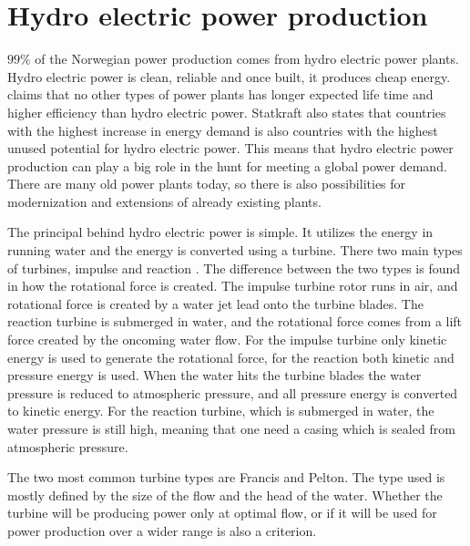 \section{Hydro electric power production}\label{ref:sec_hydropower}
    $99\%$ of the Norwegian power production comes from hydro electric power plants. Hydro electric power is clean, reliable and once built, it produces cheap energy. \cite{Statkraft2009} claims that no other types of power plants has longer expected life time and higher efficiency than hydro electric power. Statkraft also states that countries with the highest increase in energy demand is also countries with the highest unused potential for hydro electric power. This means that hydro electric power production can play a big role in the hunt for meeting a global power demand. There are many old power plants today, so there is also possibilities for modernization and extensions of already existing plants. 
    
    The principal behind hydro electric power is simple. It utilizes the energy in running water and the energy is converted using a turbine. There two main types of turbines, impulse and reaction \cite{Paish2002}. The difference between the two types is found in how the rotational force is created. The impulse turbine rotor runs in air, and rotational force is created by a water jet lead onto the turbine blades. The reaction turbine is submerged in water, and the rotational force comes from a lift force created by the oncoming water flow. For the impulse turbine only kinetic energy is used to generate the rotational force, for the reaction both kinetic and pressure energy is used. When the water hits the turbine blades the water pressure is reduced to atmospheric pressure, and all pressure energy is converted to kinetic energy. For the reaction turbine, which is submerged in water, the water pressure is still high, meaning that one need a casing which is sealed from atmospheric pressure. 
    
    
    
    The two most common turbine types are Francis and Pelton. The type used is mostly defined by the size of the flow and the head of the water. Whether the turbine will be producing power only at optimal flow, or if it will be used for power production over a wider range is also a criterion. 
    
